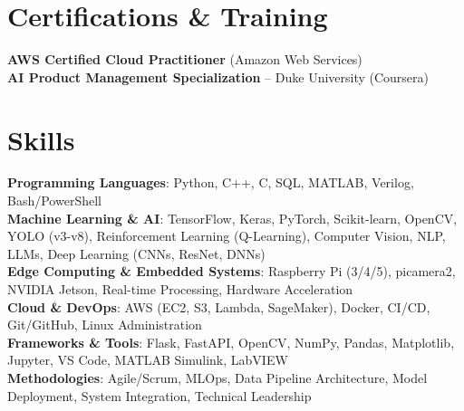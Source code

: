 \documentclass[letterpaper,11pt]{article}
\begin{document}
\section{Certifications \& Training}
 \begin{itemize}[leftmargin=0.15in, label={}]
    \small{\item{
     \textbf{AWS Certified Cloud Practitioner} (Amazon Web Services) \\
     \textbf{AI Product Management Specialization} -- Duke University (Coursera)
    }}
 \end{itemize}

\section{Skills}
 \begin{itemize}[leftmargin=0.15in, label={}]
    \small{\item{
     \textbf{Programming Languages}{: Python, C++, C, SQL, MATLAB, Verilog, Bash/PowerShell} \\
     \textbf{Machine Learning \& AI}{: TensorFlow, Keras, PyTorch, Scikit-learn, OpenCV, YOLO (v3-v8), Reinforcement Learning (Q-Learning), Computer Vision, NLP, LLMs, Deep Learning (CNNs, ResNet, DNNs)} \\
     \textbf{Edge Computing \& Embedded Systems}{: Raspberry Pi (3/4/5), picamera2, NVIDIA Jetson, Real-time Processing, Hardware Acceleration} \\
     \textbf{Cloud \& DevOps}{: AWS (EC2, S3, Lambda, SageMaker), Docker, CI/CD, Git/GitHub, Linux Administration} \\
     \textbf{Frameworks \& Tools}{: Flask, FastAPI, OpenCV, NumPy, Pandas, Matplotlib, Jupyter, VS Code, MATLAB Simulink, LabVIEW} \\
     \textbf{Methodologies}{: Agile/Scrum, MLOps, Data Pipeline Architecture, Model Deployment, System Integration, Technical Leadership}
    }}
 \end{itemize}

\end{document}
